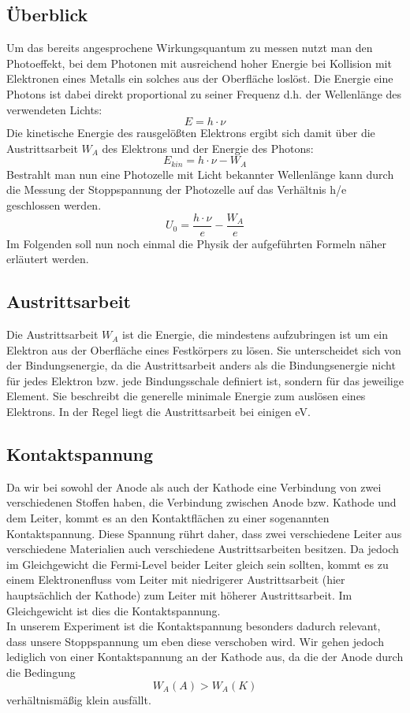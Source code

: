 \documentclass{scrartcl}
\begin{document}
	\subsection{Überblick}
		Um das bereits angesprochene Wirkungsquantum zu messen nutzt man den Photoeffekt, bei dem 
		Photonen mit ausreichend hoher Energie bei Kollision mit Elektronen eines Metalls ein solches 
		aus der Oberfläche loslöst. Die Energie eine Photons ist dabei direkt proportional zu seiner Frequenz d.h. der 
		Wellenlänge des verwendeten Lichts:
		\begin{equation}
			E = h \cdot \nu
		\end{equation}
		Die kinetische Energie des rausgelößten Elektrons ergibt sich damit über die 
		Austrittsarbeit $W_A$ des Elektrons und der Energie des Photons:
		\begin{equation}
			E_{kin} = h \cdot \nu - W_A
		\end{equation}
		Bestrahlt man nun eine Photozelle mit Licht bekannter Wellenlänge kann durch die Messung der 
		Stoppspannung der Photozelle auf das Verhältnis h/e geschlossen werden.
		\begin{equation}
			U_0 = \frac{h\cdot \nu}{e} - \frac{W_A}{e}
		\end{equation}
		Im Folgenden soll nun noch einmal die Physik der aufgeführten Formeln näher erläutert werden.
	\subsection{Austrittsarbeit}
		Die Austrittsarbeit $W_A$ ist die Energie, die mindestens aufzubringen ist um ein Elektron aus 
		der Oberfläche eines Festkörpers zu lösen. Sie unterscheidet sich von der Bindungsenergie, da 
		die Austrittsarbeit anders als die Bindungsenergie nicht für jedes Elektron bzw. jede Bindungsschale definiert
		ist, sondern für das jeweilige Element. Sie beschreibt die generelle minimale Energie zum auslösen eines Elektrons.
		In der Regel liegt die Austrittsarbeit bei einigen eV.
	\subsection{Kontaktspannung}
		Da wir bei sowohl der Anode als auch der Kathode eine Verbindung von zwei verschiedenen Stoffen haben, die Verbindung
		zwischen Anode bzw. Kathode und dem Leiter, kommt es an den Kontaktflächen zu einer sogenannten Kontaktspannung.
		Diese Spannung rührt daher, dass zwei verschiedene Leiter aus verschiedene Materialien auch verschiedene Austrittsarbeiten
		besitzen. Da jedoch im Gleichgewicht die Fermi-Level beider Leiter gleich sein sollten, kommt es zu einem Elektronenfluss
		vom Leiter mit niedrigerer Austrittsarbeit (hier hauptsächlich der Kathode) zum Leiter mit höherer Austrittsarbeit. Im Gleichgewicht
		ist dies die Kontaktspannung.\\
		In unserem Experiment ist die Kontaktspannung besonders dadurch relevant, dass unsere Stoppspannung um eben diese verschoben wird. Wir gehen jedoch
		lediglich von einer Kontaktspannung an der Kathode aus, da die der Anode durch die Bedingung
		\begin{equation}
			W_A(A) > W_A(K)
		\end{equation}
		verhältnismäßig klein ausfällt.
\end{document}
